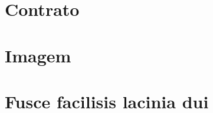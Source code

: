 
\begin{anexosenv}

  \partanexos
  
  \chapter{Contrato}
  \lipsum[30]
  
  \chapter{Imagem}
  
  \lipsum[31]
  
  \chapter{Fusce facilisis lacinia dui}
  
  \lipsum[32]
  
  \end{anexosenv}
  
